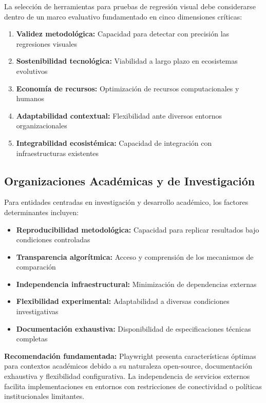 \documentclass{article}
\begin{document}
La selección de herramientas para pruebas de regresión visual debe considerarse dentro de un marco evaluativo fundamentado en cinco dimensiones críticas:

\begin{enumerate}[nosep]
\item \textbf{Validez metodológica:} Capacidad para detectar con precisión las regresiones visuales
\item \textbf{Sostenibilidad tecnológica:} Viabilidad a largo plazo en ecosistemas evolutivos
\item \textbf{Economía de recursos:} Optimización de recursos computacionales y humanos
\item \textbf{Adaptabilidad contextual:} Flexibilidad ante diversos entornos organizacionales
\item \textbf{Integrabilidad ecosistémica:} Capacidad de integración con infraestructuras existentes
\end{enumerate}

\subsection{Organizaciones Académicas y de Investigación}

Para entidades centradas en investigación y desarrollo académico, los factores determinantes incluyen:

\begin{itemize}[nosep]
\item \textbf{Reproducibilidad metodológica:} Capacidad para replicar resultados bajo condiciones controladas
\item \textbf{Transparencia algorítmica:} Acceso y comprensión de los mecanismos de comparación
\item \textbf{Independencia infraestructural:} Minimización de dependencias externas
\item \textbf{Flexibilidad experimental:} Adaptabilidad a diversas condiciones investigativas
\item \textbf{Documentación exhaustiva:} Disponibilidad de especificaciones técnicas completas
\end{itemize}

\textbf{Recomendación fundamentada:} Playwright presenta características óptimas para contextos académicos debido a su naturaleza open-source, documentación exhaustiva y flexibilidad configurativa. La independencia de servicios externos facilita implementaciones en entornos con restricciones de conectividad o políticas institucionales limitantes.
\end{document}
